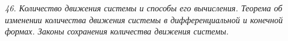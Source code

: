 \emph{46. Количество движения системы и способы его вычисления. Теорема об
изменении количества движения системы в дифференциальной и конечной
формах. Законы сохранения количества движения системы.}

\newpage
